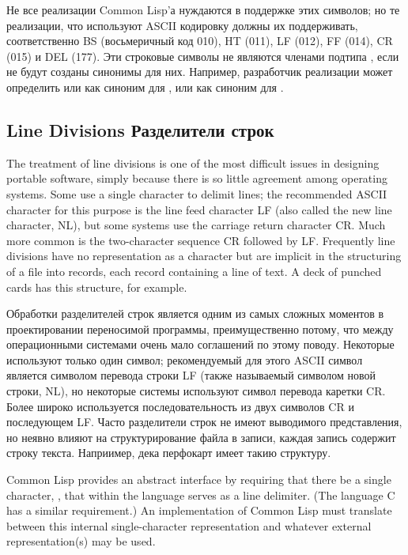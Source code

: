 Не все реализации Common Lisp'а нуждаются в поддержке этих символов; но те
реализации, что используют ASCII кодировку должны их поддерживать,
соответственно BS (восьмеричный код 010), HT (011), LF (012), FF (014), CR
(015) и DEL (177). Эти строковые символы не являются членами подтипа
, если не будут созданы синонимы для них.
Например, разработчик реализации может 
определить  или  как
синоним для ,
или  как синоним для .

\subsection{Line Divisions Разделители строк}

The treatment of line divisions is one of the most difficult issues
in designing portable software, simply because there is so little agreement
among operating systems.  Some use a single character to delimit lines;
the recommended ASCII character for this purpose is the line feed character
LF (also called the new line character, NL),
but some systems use the carriage
return character CR.  Much more common is the two-character sequence
CR followed by LF.  Frequently line divisions have no representation
as a character but are implicit in the structuring of a file into records,
each record containing a line of text.  A deck of punched cards has this
structure, for example.

Обработки разделителей строк является одним из самых сложных моментов в
проектировании переносимой программы, преимущественно потому, что между
операционными системами очень мало соглашений по этому поводу. Некоторые
используют только один символ; рекомендуемый для этого ASCII символ является
символом перевода строки LF (также называемый символом новой строки, NL),
но некоторые системы используют символ перевода каретки CR. Более
широко используется последовательность из двух символов CR и последующем
LF. Часто разделители строк не имеют выводимого представления, но неявно влияют
на структурирование файла в записи, каждая запись содержит строку
текста. Наприимер, дека перфокарт имеет такию структуру.

Common Lisp provides an abstract interface by requiring that there be a single
character, , that within the language serves as a line
delimiter.  (The language C has a similar requirement.)
An implementation of Common Lisp must translate between this internal
single-character representation and whatever external representation(s)
may be used.

